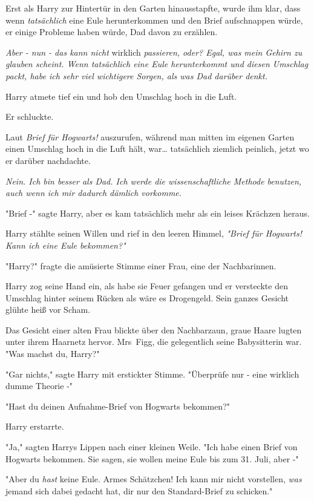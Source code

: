 {Erst als Harry zur Hintertür in den Garten hinausstapfte, wurde ihm klar, dass wenn \emph{tatsächlich} eine Eule herunterkommen und den Brief aufschnappen würde, er einige Probleme haben würde, Dad davon zu erzählen.

\emph{Aber - nun - das kann nicht} wirklich \emph{passieren, oder? Egal, was mein Gehirn zu glauben scheint. Wenn tatsächlich eine Eule herunterkommt und diesen Umschlag packt, habe ich sehr viel wichtigere Sorgen, als was Dad darüber denkt.}

Harry atmete tief ein und hob den Umschlag hoch in die Luft.

Er schluckte.

Laut \emph{Brief für Hogwarts!} auszurufen, während man mitten im eigenen Garten einen Umschlag hoch in die Luft hält, war… tatsächlich ziemlich peinlich, jetzt wo er darüber nachdachte.

\emph{Nein. Ich bin besser als Dad. Ich werde die wissenschaftliche Methode benutzen, auch wenn ich mir dadurch dämlich vorkomme.}

"Brief -" sagte Harry, aber es kam tatsächlich mehr als ein leises Krächzen heraus.

Harry stählte seinen Willen und rief in den leeren Himmel, \emph{"Brief für Hogwarts! Kann ich eine Eule bekommen?"}

"Harry?" fragte die amüsierte Stimme einer Frau, eine der Nachbarinnen.

Harry zog seine Hand ein, als habe sie Feuer gefangen und er versteckte den Umschlag hinter seinem Rücken als wäre es Drogengeld. Sein ganzes Gesicht glühte heiß vor Scham.

Das Gesicht einer alten Frau blickte über den Nachbarzaun, graue Haare lugten unter ihrem Haarnetz hervor. Mrs~Figg, die gelegentlich seine Babysitterin war. "Was machst du, Harry?"

"Gar nichts," sagte Harry mit erstickter Stimme. "Überprüfe nur - eine wirklich dumme Theorie -"

"Hast du deinen Aufnahme-Brief von Hogwarts bekommen?"

Harry erstarrte.

"Ja," sagten Harrys Lippen nach einer kleinen Weile. "Ich habe einen Brief von Hogwarts bekommen. Sie sagen, sie wollen meine Eule bis zum 31. Juli, aber -"

"Aber du \emph{hast} keine Eule. Armes Schätzchen! Ich kann mir nicht vorstellen, \emph{was} jemand sich dabei gedacht hat, dir nur den Standard-Brief zu schicken."

}
